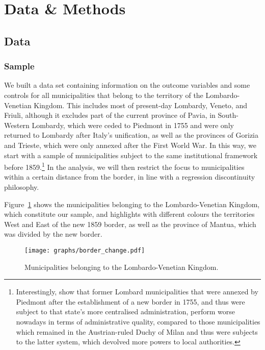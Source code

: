 \section{Data \& Methods}

\subsection{Data}
\subsubsection{Sample} 
We built a data set containing information on the outcome variables and some controls for all municipalities that belong to the territory of the Lombardo-Venetian Kingdom. 
This includes most of present-day Lombardy, Veneto, and Friuli, although it excludes part of the current province of Pavia, in South-Western Lombardy, which were ceded to Piedmont in 1755 \citep{cainelli2023} and were only returned to Lombardy after Italy's unification, as well as the provinces of Gorizia and Trieste, which were only annexed after the First World War. In this way, we start with a sample of municipalities subject to the same institutional framework before 1859.\footnote{Interestingly, \cite{cainelli2023} %
show that former Lombard municipalities that were annexed by Piedmont after the establishment of a new border in 1755, and thus were subject to that state's more centralised administration, perform worse nowadays in terms of administrative quality, compared to those municipalities which remained in the Austrian-ruled Duchy of Milan and thus were subjects to the latter system, which devolved more powers to local authorities. 
} 
In the analysis, we will then restrict the focus to municipalities within a certain distance from the border, in line with a regression discontinuity philosophy.

Figure~\ref{fig:border_change} shows the municipalities belonging to the Lombardo-Venetian Kingdom, which constitute our sample, and highlights with different colours the territories West and East of the new 1859 border, as well as the province of Mantua, which was divided by the new border.   

\begin{figure}[!h]
    \centering
    \texttt{[image: graphs/border\_change.pdf]}
    \caption{Municipalities belonging to the Lombardo-Venetian Kingdom.}
    \label{fig:border_change}
\end{figure}

